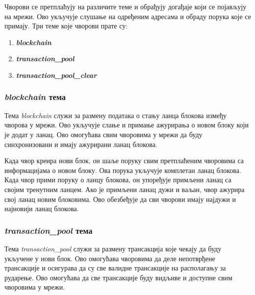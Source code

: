 \documentclass[12pt, a4paper]{article}
\begin{document}








Чворови се претплаћују на различите теме и обрађују догађаје који се појављују на мрежи. Ово укључује слушање на одређеним адресама и обраду порука које се примају. Три теме које чворови прате су:
\begin{enumerate}
    \item \textbf{\textit{blockchain}}
    \item \textbf{\textit{transaction\_pool}}
    \item \textbf{\textit{transaction\_pool\_clear}}
    
\end{enumerate}

\subsubsection{\textbf{\textit{blockchain}} тема}
Тема \textit{blockchain} служи за размену података о стању ланца блокова између чворова у мрежи. Ово укључује слање и примање ажурирања о новом блоку који је додат у ланац. Ово омогућава свим чворовима у мрежи да буду синхронизовани и имају ажурирани ланац блокова.

Када чвор креира нови блок, он шаље поруку свим претплаћеним чворовима са информацијама о новом блоку. Ова порука укључује комплетан ланац блокова. Када чвор прими поруку о ланцу блокова, он упоређује примљени ланац са својим тренутним ланцем. Ако је примљени ланац дужи и ваљан, чвор ажурира свој ланац новим блоковима. Ово обезбеђује да сви чворови имају најдужи и најновији ланац блокова.

\newpage
\subsubsection{\textbf{\textit{transaction\_pool}} тема}
Тема \textit{transaction\_pool} служи за размену трансакција које чекају да буду укључене у нови блок. Ово омогућава чворовима да деле непотврђене трансакције и осигурава да су све валидне трансакције на располагању за рударење. Ово омогућава да све трансакције буду видљиве и доступне свим чворовима у мрежи.
\end{document}
